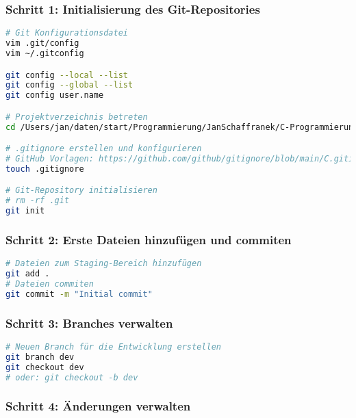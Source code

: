 \documentclass{vorlage-design-main}
\begin{document}
\hypertarget{schritt-1-initialisierung-des-git-repositories}{%
\subsubsection{Schritt 1: Initialisierung des
Git-Repositories}\label{schritt-1-initialisierung-des-git-repositories}}

\begin{lstlisting}[language=bash]
# Git Konfigurationsdatei
vim .git/config
vim ~/.gitconfig

git config --local --list
git config --global --list
git config user.name

# Projektverzeichnis betreten
cd /Users/jan/daten/start/Programmierung/JanSchaffranek/C-Programmierung/c-projekte

# .gitignore erstellen und konfigurieren
# GitHub Vorlagen: https://github.com/github/gitignore/blob/main/C.gitignore
touch .gitignore

# Git-Repository initialisieren
# rm -rf .git
git init
\end{lstlisting}

\hypertarget{schritt-2-erste-dateien-hinzufuxfcgen-und-commiten}{%
\subsubsection{Schritt 2: Erste Dateien hinzufügen und
commiten}\label{schritt-2-erste-dateien-hinzufuegen-und-commiten}}

\begin{lstlisting}[language=bash]
# Dateien zum Staging-Bereich hinzufügen
git add .
# Dateien commiten
git commit -m "Initial commit"
\end{lstlisting}

\hypertarget{schritt-3-branches-verwalten}{%
\subsubsection{Schritt 3: Branches
verwalten}\label{schritt-3-branches-verwalten}}

\begin{lstlisting}[language=bash]
# Neuen Branch für die Entwicklung erstellen
git branch dev
git checkout dev
# oder: git checkout -b dev
\end{lstlisting}

\hypertarget{schritt-4-uxe4nderungen-verwalten}{%
\subsubsection{Schritt 4: Änderungen
verwalten}\label{schritt-4-aenderungen-verwalten}}
\end{document}
